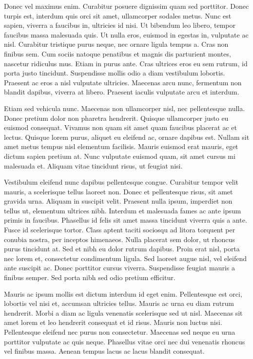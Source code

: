 Donec vel maximus enim. Curabitur posuere dignissim quam sed porttitor. Donec turpis est, interdum quis orci sit amet, ullamcorper sodales metus. Nunc est sapien, viverra a faucibus in, ultricies id nisi. Ut bibendum leo libero, tempor faucibus massa malesuada quis. Ut nulla eros, euismod in egestas in, vulputate ac nisl. Curabitur tristique purus neque, nec ornare ligula tempus a. Cras non finibus sem. Cum sociis natoque penatibus et magnis dis parturient montes, nascetur ridiculus mus. Etiam in purus ante. Cras ultrices eros eu sem rutrum, id porta justo tincidunt. Suspendisse mollis odio a diam vestibulum lobortis. Praesent ac eros a nisl vulputate ultricies. Maecenas arcu nunc, fermentum non blandit dapibus, viverra at libero. Praesent iaculis vulputate arcu et interdum.

Etiam sed vehicula nunc. Maecenas non ullamcorper nisl, nec pellentesque nulla. Donec pretium dolor non pharetra hendrerit. Quisque ullamcorper justo eu euismod consequat. Vivamus non quam sit amet quam faucibus placerat ac et lectus. Quisque lorem purus, aliquet eu eleifend ac, ornare dapibus est. Nullam sit amet metus tempus nisl elementum facilisis. Mauris euismod erat mauris, eget dictum sapien pretium at. Nunc vulputate euismod quam, sit amet cursus mi malesuada et. Aliquam vitae tincidunt risus, ut feugiat nisi.

Vestibulum eleifend nunc dapibus pellentesque congue. Curabitur tempor velit mauris, a scelerisque tellus laoreet non. Donec et pellentesque risus, sit amet gravida urna. Aliquam in suscipit velit. Praesent nulla ipsum, imperdiet non tellus ut, elementum ultrices nibh. Interdum et malesuada fames ac ante ipsum primis in faucibus. Phasellus id felis sit amet massa tincidunt viverra quis a ante. Fusce id scelerisque tortor. Class aptent taciti sociosqu ad litora torquent per conubia nostra, per inceptos himenaeos. Nulla placerat sem dolor, ut rhoncus purus tincidunt at. Sed et nibh eu dolor rutrum dapibus. Proin erat nisl, porta nec lorem et, consectetur condimentum ligula. Sed laoreet augue nisl, vel eleifend ante suscipit ac. Donec porttitor cursus viverra. Suspendisse feugiat mauris a finibus semper. Sed porta nibh sed odio pretium efficitur.

Mauris ac ipsum mollis est dictum interdum id eget enim. Pellentesque est orci, lobortis vel nisi et, accumsan ultricies tellus. Mauris ac urna eu diam rutrum hendrerit. Morbi a diam ac ligula venenatis scelerisque sed ut nisl. Maecenas sit amet lorem et leo hendrerit consequat et id risus. Mauris non luctus nisi. Pellentesque eleifend nec purus non consectetur. Maecenas sed neque eu urna porttitor vulputate ac quis neque. Phasellus vitae orci nec dui venenatis rhoncus vel finibus massa. Aenean tempus lacus ac lacus blandit consequat.

